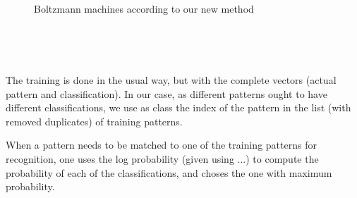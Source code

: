 \ \ \ \ \ \ \ \ \ \ \ \ \ \ \ \ \ \begin{figure}[h]
  \ \ \ \ \ \ \ \ \ \ \ \ \
  \caption{Boltzmann machines according to our new method}
\end{figure} \ \ \ \ \ \ \ \ \ \ \ \ \ \ \ \ \ \ \ \ \ \ \ \ \ \ \ \ \ \ \ \ \
\ \ \ \ \ \

\ \ \ \ \ \ \ \ \ \ \ \ \ \ \ \ \ \ \ \ \ \ \ \ \ \ \ \ \ \ \ \ \ \

The training is done in the usual way, but with the complete vectors (actual
pattern and classification). In our case, as different patterns ought to have
different classifications, we use as class the index of the pattern in the list
(with removed duplicates) of training patterns.

When a pattern needs to be matched to one of the training patterns for
recognition, one uses the log probability (given using ...) to compute the
probability of each of the classifications, and choses the one with maximum
probability.



